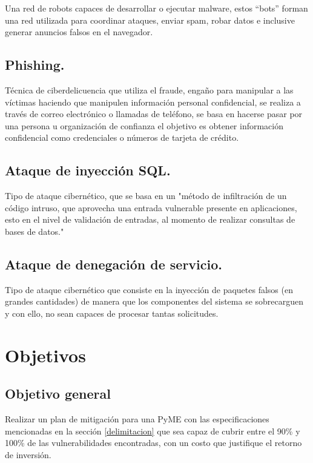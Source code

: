 \documentclass[10pt]{article}
\begin{document}
Una red de robots capaces de desarrollar o ejecutar malware, estos ``bots'' forman una red utilizada para coordinar ataques, enviar spam, robar datos e inclusive generar anuncios falsos en el navegador. \cite{5}

\subsection{Phishing.}

Técnica de ciberdelicuencia que utiliza el fraude, engaño para manipular a las víctimas haciendo que manipulen información personal confidencial, se realiza a través de correo electrónico o llamadas de teléfono, se basa en hacerse pasar por una persona u organización de confianza el objetivo es obtener información confidencial como credenciales o números de tarjeta de crédito. \cite{7}

\subsection{Ataque de inyección SQL.}
Tipo de ataque cibernético, que se basa en un "método de infiltración de un código intruso, que aprovecha una entrada vulnerable presente en aplicaciones, esto en el nivel de validación de entradas, al momento de realizar consultas de bases de datos." \cite{8}


\subsection{Ataque de denegación de servicio.}
Tipo de ataque cibernético que consiste en la inyección de paquetes falsos (en grandes cantidades) de manera que los componentes del sistema se sobrecarguen y con ello, no sean capaces de procesar tantas solicitudes. \cite{9}



\section{Objetivos}

\subsection{Objetivo general}

Realizar un plan de mitigación para una PyME con las especificaciones mencionadas en la sección \ref{delimitacion} que sea capaz de cubrir entre el 90\% y 100\% de las vulnerabilidades encontradas, con un costo que justifique el retorno de inversión.
\end{document}
